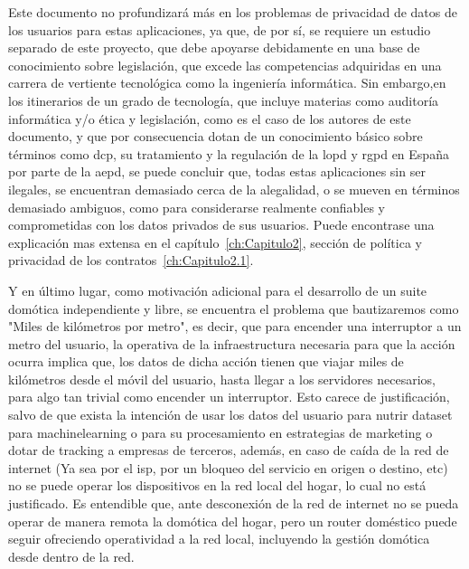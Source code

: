 \vspace{1cm}

Este documento no profundizará más en los problemas de privacidad de datos de los usuarios para estas aplicaciones, ya que, de por sí, se requiere un estudio separado de este proyecto, que debe apoyarse debidamente en una base de conocimiento sobre legislación, que excede las competencias adquiridas en una carrera de vertiente tecnológica como la ingeniería informática. Sin embargo,en los itinerarios de un grado de tecnología, que incluye materias como auditoría informática y/o ética y legislación, como es el caso de los autores de este documento, y que por consecuencia dotan de un conocimiento básico sobre términos como \gls{dcp}, su tratamiento y la regulación de la \gls{lopd} y \gls{rgpd} en España por parte de la \gls{aepd}, se puede concluir que, todas estas aplicaciones sin ser ilegales, se encuentran demasiado cerca de la alegalidad, o se mueven en términos demasiado ambiguos, como para considerarse realmente confiables y comprometidas con los datos privados de sus usuarios. Puede encontrase una explicación mas extensa en el capítulo~\ref{ch:Capitulo2}, sección de política y privacidad de los contratos~\ref{ch:Capitulo2.1}.

\vspace{1cm}

Y en último lugar, como motivación adicional para el desarrollo de un suite domótica independiente y libre, se encuentra el problema que bautizaremos como "Miles de kilómetros por metro", es decir, que para encender una interruptor a un metro del usuario, la operativa de la infraestructura necesaria para que la acción ocurra implica que, los datos de dicha acción tienen que viajar miles de kilómetros desde el móvil del usuario, hasta llegar a los servidores necesarios, para algo tan trivial como encender un interruptor. Esto carece de justificación, salvo de que exista la intención de usar los datos del usuario para nutrir \gls{dataset} para \gls{machinelearning} o para su procesamiento en estrategias de marketing o dotar de tracking a empresas de terceros, además, en caso de caída de la red de internet (Ya sea por el \gls{isp}, por un bloqueo del servicio en origen o destino, etc) no se puede operar los dispositivos en la red local del hogar, lo cual no está justificado. Es entendible que, ante desconexión de la red de internet no se pueda operar de manera remota la domótica del hogar, pero un router doméstico puede seguir ofreciendo operatividad a la red local, incluyendo la gestión domótica desde dentro de la red.

